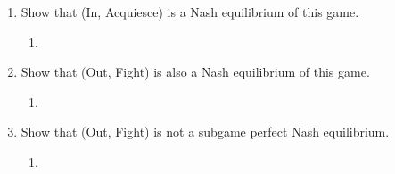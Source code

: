 \documentclass[11pt]{article}
\begin{document}
\begin{enumerate}
\begin{center}
\end{center}

	\begin{enumerate}
	\item Show that (In, Acquiesce) is a Nash equilibrium of this game.
	\begin{enumerate}
        \item 
    \end{enumerate}
	
	\item Show that (Out, Fight) is also a Nash equilibrium of this game.
	\begin{enumerate}
        \item 
    \end{enumerate}
	

	\item Show that (Out, Fight) is not a subgame perfect Nash equilibrium.
	\begin{enumerate}
        \item 
    \end{enumerate}
	\end{enumerate}

\end{enumerate}
\end{document}
